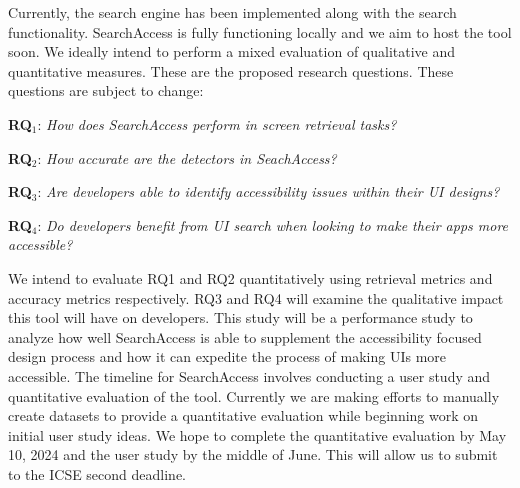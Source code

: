 Currently, the search engine has been implemented along with the search functionality. SearchAccess is fully functioning locally and we aim to host the tool soon. We ideally intend to perform a mixed evaluation of qualitative and quantitative measures. 
These are the proposed research questions. These questions are subject to change: 
\begin{description}
  
    \item \textbf{RQ$_1$}: \textit{How does SearchAccess perform in screen retrieval tasks?}
    \item \textbf{RQ$_2$}: \textit{How accurate are the detectors in SeachAccess?}
    \item \textbf{RQ$_3$}: \textit{Are developers able to identify accessibility issues within their UI designs?}
    \item \textbf{RQ$_4$}: \textit{Do developers benefit from UI search when looking to make their apps more accessible?}

 \end{description}

We intend to evaluate RQ1 and RQ2 quantitatively using retrieval metrics and accuracy metrics respectively. RQ3 and RQ4 will examine the qualitative impact this tool will have on developers. This study will be a performance study to analyze how well SearchAccess is able to supplement the accessibility focused design process and how it can expedite the process of making UIs more accessible. 
The timeline for SearchAccess involves conducting a user study and quantitative evaluation of the tool. Currently we are making efforts to manually create datasets to provide a quantitative evaluation while beginning work on initial user study ideas. We hope to complete the quantitative evaluation by May 10, 2024 and the user study by the middle of June. This will allow us to submit to the ICSE second deadline. 












